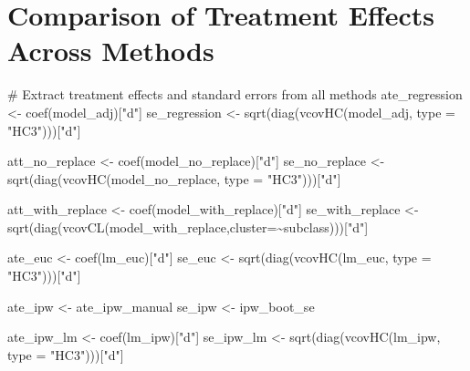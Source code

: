 \documentclass[
  letterpaper,
  DIV=11,
  numbers=noendperiod]{scrartcl}
\newenvironment{Shaded}{\begin{snugshade}}{\end{snugshade}}
\newcommand{\AttributeTok}[1]{\textcolor[rgb]{0.40,0.45,0.13}{#1}}
\newcommand{\CommentTok}[1]{\textcolor[rgb]{0.37,0.37,0.37}{#1}}
\newcommand{\FunctionTok}[1]{\textcolor[rgb]{0.28,0.35,0.67}{#1}}
\newcommand{\NormalTok}[1]{\textcolor[rgb]{0.00,0.23,0.31}{#1}}
\newcommand{\OtherTok}[1]{\textcolor[rgb]{0.00,0.23,0.31}{#1}}
\newcommand{\SpecialCharTok}[1]{\textcolor[rgb]{0.37,0.37,0.37}{#1}}
\newcommand{\StringTok}[1]{\textcolor[rgb]{0.13,0.47,0.30}{#1}}
\begin{document}
\section{Comparison of Treatment Effects Across
Methods}\label{comparison-of-treatment-effects-across-methods}

\begin{Shaded}
\begin{Highlighting}[]
\CommentTok{\# Extract treatment effects and standard errors from all methods}
\NormalTok{ate\_regression }\OtherTok{\textless{}{-}} \FunctionTok{coef}\NormalTok{(model\_adj)[}\StringTok{"d"}\NormalTok{]}
\NormalTok{se\_regression }\OtherTok{\textless{}{-}} \FunctionTok{sqrt}\NormalTok{(}\FunctionTok{diag}\NormalTok{(}\FunctionTok{vcovHC}\NormalTok{(model\_adj, }\AttributeTok{type =} \StringTok{"HC3"}\NormalTok{)))[}\StringTok{"d"}\NormalTok{]}

\NormalTok{att\_no\_replace }\OtherTok{\textless{}{-}} \FunctionTok{coef}\NormalTok{(model\_no\_replace)[}\StringTok{"d"}\NormalTok{]}
\NormalTok{se\_no\_replace }\OtherTok{\textless{}{-}} \FunctionTok{sqrt}\NormalTok{(}\FunctionTok{diag}\NormalTok{(}\FunctionTok{vcovHC}\NormalTok{(model\_no\_replace, }\AttributeTok{type =} \StringTok{"HC3"}\NormalTok{)))[}\StringTok{"d"}\NormalTok{]}

\NormalTok{att\_with\_replace }\OtherTok{\textless{}{-}} \FunctionTok{coef}\NormalTok{(model\_with\_replace)[}\StringTok{"d"}\NormalTok{]}
\NormalTok{se\_with\_replace }\OtherTok{\textless{}{-}} \FunctionTok{sqrt}\NormalTok{(}\FunctionTok{diag}\NormalTok{(}\FunctionTok{vcovCL}\NormalTok{(model\_with\_replace,}\AttributeTok{cluster=}\SpecialCharTok{\textasciitilde{}}\NormalTok{subclass)))[}\StringTok{"d"}\NormalTok{]}

\NormalTok{ate\_euc }\OtherTok{\textless{}{-}} \FunctionTok{coef}\NormalTok{(lm\_euc)[}\StringTok{"d"}\NormalTok{]}
\NormalTok{se\_euc }\OtherTok{\textless{}{-}} \FunctionTok{sqrt}\NormalTok{(}\FunctionTok{diag}\NormalTok{(}\FunctionTok{vcovHC}\NormalTok{(lm\_euc, }\AttributeTok{type =} \StringTok{"HC3"}\NormalTok{)))[}\StringTok{"d"}\NormalTok{]}

\NormalTok{ate\_ipw }\OtherTok{\textless{}{-}}\NormalTok{ ate\_ipw\_manual}
\NormalTok{se\_ipw }\OtherTok{\textless{}{-}}\NormalTok{ ipw\_boot\_se}

\NormalTok{ate\_ipw\_lm }\OtherTok{\textless{}{-}} \FunctionTok{coef}\NormalTok{(lm\_ipw)[}\StringTok{"d"}\NormalTok{]}
\NormalTok{se\_ipw\_lm }\OtherTok{\textless{}{-}} \FunctionTok{sqrt}\NormalTok{(}\FunctionTok{diag}\NormalTok{(}\FunctionTok{vcovHC}\NormalTok{(lm\_ipw, }\AttributeTok{type =} \StringTok{"HC3"}\NormalTok{)))[}\StringTok{"d"}\NormalTok{]}


\end{Highlighting}
\end{Shaded}
\end{document}
